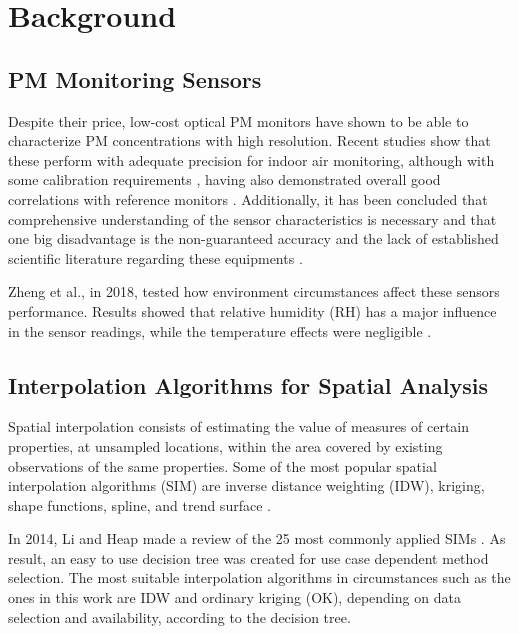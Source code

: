 
\section{Background}
\label{sec: backg}
\subsection{PM Monitoring Sensors}

Despite their price, low-cost optical PM monitors have shown to be able to characterize PM concentrations with high resolution. Recent studies show that these perform with adequate precision for indoor air monitoring, although with some calibration requirements \cite{Manikonda2016}, having also demonstrated overall good correlations with reference monitors \cite{Sayahi2018}. Additionally, it has been concluded that comprehensive understanding of the sensor characteristics is necessary and that one big disadvantage is the non-guaranteed accuracy and the lack of established scientific literature regarding these equipments \cite{Kuula2019}.

Zheng et al., in 2018, tested how environment circumstances affect these sensors performance. Results showed that relative humidity (RH) has a major influence in the sensor readings, while the temperature effects were negligible \cite{Zheng2018}.

\subsection{Interpolation Algorithms for Spatial Analysis}

Spatial interpolation consists of estimating the value of measures of certain properties, at unsampled locations, within the area covered by existing observations of the same properties. Some of the most popular spatial interpolation algorithms (SIM) are inverse distance weighting (IDW), kriging, shape functions, spline, and trend surface \cite{Li2008}.

In 2014, Li and Heap made a review of the 25 most commonly applied SIMs \cite{Li2014}. As result, an easy to use decision tree was created for use case dependent method selection. The most suitable interpolation algorithms in circumstances such as the ones in this work are IDW and ordinary kriging (OK), depending on data selection and availability, according to the decision tree.

